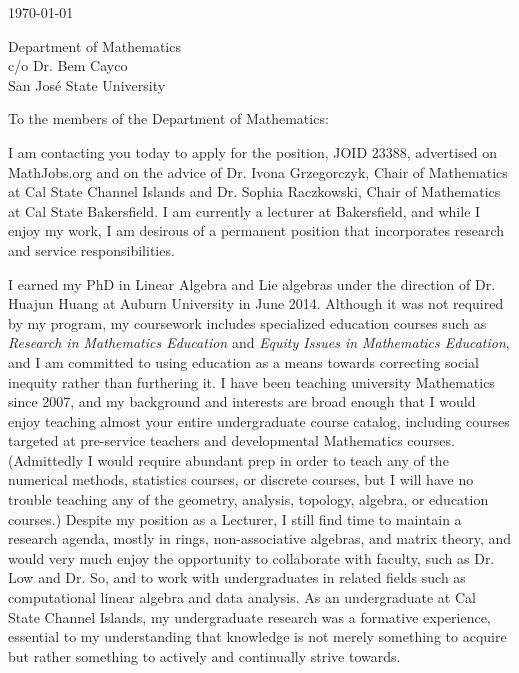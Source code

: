 \documentclass[10pt]{article}
\begin{document}
\makeletterhead{}

\vfill

\today

\vfill

Department of Mathematics\\
c/o Dr. Bem Cayco\\
San Jos\'{e} State University

\vfill

To the members of the Department of Mathematics:

\vfill

I am contacting you today to apply for the position, JOID 23388,
advertised on MathJobs.org and on the advice of Dr. Ivona Grzegorczyk,
Chair of Mathematics at Cal State Channel Islands and Dr. Sophia
Raczkowski, Chair of Mathematics at Cal State Bakersfield. I am
currently a lecturer at Bakersfield, and while I enjoy my work, I am
desirous of a permanent position that incorporates research and service
responsibilities.

I earned my PhD in Linear Algebra and Lie algebras under the direction
of Dr. Huajun Huang at Auburn University in June 2014. Although it was
not required by my program, my coursework includes specialized education
courses such as \emph{Research in Mathematics Education} and
\emph{Equity Issues in Mathematics Education}, and I am committed to
using education as a means towards correcting social inequity rather
than furthering it. I have been teaching university Mathematics since
2007, and my background and interests are broad enough that I would
enjoy teaching almost your entire undergraduate course catalog,
including courses targeted at pre-service teachers and developmental
Mathematics courses. (Admittedly I would require abundant prep in order
to teach any of the numerical methods, statistics courses, or discrete
courses, but I will have no trouble teaching any of the geometry,
analysis, topology, algebra, or education courses.) Despite my position
as a Lecturer, I still find time to maintain a research agenda, mostly
in rings, non-associative algebras, and matrix theory, and would very
much enjoy the opportunity to collaborate with faculty, such as Dr. Low
and Dr. So, and to work with undergraduates in related fields such as
computational linear algebra and data analysis. As an undergraduate at
Cal State Channel Islands, my undergraduate research was a formative
experience, essential to my understanding that knowledge is not merely
something to acquire but rather something to actively and continually
strive towards.
\end{document}
